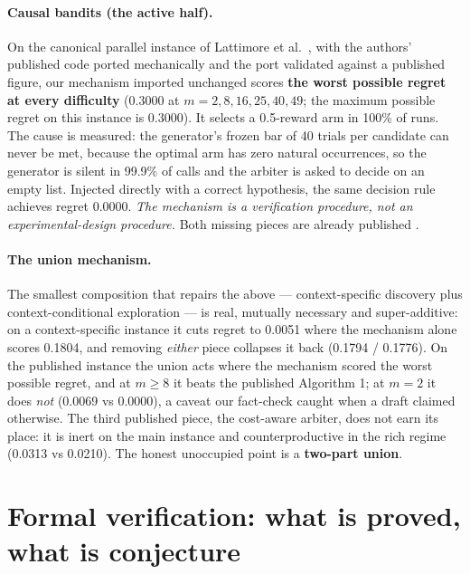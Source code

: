 \documentclass[11pt]{article}
\begin{document}
\paragraph{Causal bandits (the active half).} On the canonical parallel instance of
Lattimore et al.\ \cite{lattimore2016causal}, with the authors' published code ported
mechanically and the port validated against a published figure, our mechanism imported
unchanged scores \textbf{the worst possible regret at every difficulty} (0.3000 at
$m = 2, 8, 16, 25, 40, 49$; the maximum possible regret on this instance is 0.3000).
It selects a 0.5-reward arm in 100\% of runs. The cause is measured: the generator's
frozen bar of 40 trials per candidate can never be met, because the optimal arm has
zero natural occurrences, so the generator is silent in 99.9\% of calls and the
arbiter is asked to decide on an empty list. Injected directly with a correct
hypothesis, the same decision rule achieves regret 0.0000. \emph{The mechanism is a
verification procedure, not an experimental-design procedure.} Both missing pieces are
already published \cite{lattimore2016causal,nair2020budgeted,lu2021unknown}.

\paragraph{The union mechanism.} The smallest composition that repairs the above ---
context-specific discovery plus context-conditional exploration --- is real, mutually
necessary and super-additive: on a context-specific instance it cuts regret to 0.0051
where the mechanism alone scores 0.1804, and removing \emph{either} piece collapses it
back (0.1794 / 0.1776). On the published instance the union acts where the mechanism
scored the worst possible regret, and at $m \ge 8$ it beats the published Algorithm 1;
at $m = 2$ it does \emph{not} (0.0069 vs 0.0000), a caveat our fact-check caught when
a draft claimed otherwise. The third published piece, the cost-aware arbiter, does not
earn its place: it is inert on the main instance and counterproductive in the rich
regime (0.0313 vs 0.0210). The honest unoccupied point is a \textbf{two-part union}.

\section{Formal verification: what is proved, what is conjecture}
\label{sec:lean}
\end{document}
